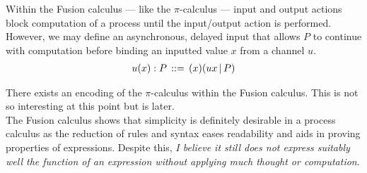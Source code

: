     \begin{example*}
        Within the Fusion calculus --- like the $\pi$-calculus --- input and output actions block computation of a process until the input/output action is performed.
        However, we may define an asynchronous, delayed input that allows $P$ to continue with computation before binding an inputted value $x$ from a channel $u$.
        \begin{align*}
            u(x): P \, ::= \, (x)(ux \, | \, P)
        \end{align*}
    \end{example*}

    
    \begin{remarks}
        There exists an encoding of the $\pi$-calculus within the Fusion calculus.
        This is not so interesting at this point but is later. \\
        The Fusion calculus shows that simplicity is definitely desirable in a process calculus as the reduction of rules and syntax eases readability and aids in proving properties of expressions.
        Despite this, \textit{I believe it still does not express suitably well the function of an expression without applying much thought or computation}.
    \end{remarks}
